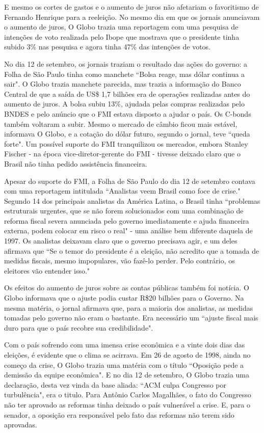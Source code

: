 \documentclass{article}
\begin{document}
E mesmo os cortes de gastos e o aumento de juros não afetariam o favoritismo de Fernando Henrique para a reeleição. No mesmo dia em que os jornais anunciavam o aumento de juros, O Globo trazia uma reportagem com uma pesquisa de intenções de voto realizada pelo Ibope que mostrava que o presidente tinha subido 3\% nas pesquisa e agora tinha 47\% das intenções de votos.              

No dia 12 de setembro, os jornais traziam o resultado das ações do governo: a Folha de São Paulo tinha como manchete ``Bolsa reage, mas dólar continua a sair". O Globo trazia manchete parecida, mas trazia a informação do Banco Central de que a saída de US\$ 1,7 bilhões era de operações realizadas antes do aumento de juros. A bolsa subiu 13\%, ajudada pelas compras realizadas pelo BNDES e pelo anúncio que o FMI estava disposto a ajudar o país. Os C-bonds também voltaram a subir. Mesmo o mercado de câmbio ficou mais estável, informava O Globo, e a cotação do dólar futuro, segundo o jornal, teve ``queda forte". Um possível suporte do FMI tranquilizou os mercados, embora Stanley Fischer - na época vice-diretor-gerente do FMI - tivesse deixado claro que o Brasil não tinha pedido assistência financeira.

Apesar do suporte do FMI, a Folha de São Paulo do dia 12 de setembro contava com uma reportagem intitulada ``Analistas veem Brasil como foce de crise." Segundo 14 dos principais analistas da América Latina, o Brasil tinha ``problemas estruturais urgentes, que se não forem solucionados com uma combinação de reforma fiscal severa anunciada pelo governo imediatamente e ajuda financeira externa, podem colocar em risco o real" - uma análise bem diferente daquela de 1997. Os analistas deixavam claro que o governo precisava agir, e um deles afirmava que ``Se o temor do presidente é a eleição, não acredito que a tomada de medidas fiscais, mesmo impopulares, vão fazê-lo perder. Pelo contrário, os eleitores vão entender isso." 

Os efeitos do aumento de juros sobre as contas públicas também foi notícia. O Globo informava que o ajuste podia custar R\$20 bilhões para o Governo. Na mesma matéria, o jornal afirmava que, para a maioria dos analistas, as medidas tomadas pelo governo não eram o bastante. Era necessário um ``ajuste fiscal mais duro para que o país recobre sua credibilidade". 

Com o país sofrendo com uma imensa crise econômica e a vinte dois dias das eleições, é evidente que o clima se acirrava. Em 26 de agosto de 1998, ainda no começo da crise, O Globo trazia uma matéria com o título ``Oposição pede a demissão da equipe econômica". E no dia 12 de setembro, O Globo trazia uma declaração, desta vez vinda da base aliada: ``ACM culpa Congresso por turbulência", era o titulo. Para Antônio Carlos Magalhães, o fato do Congresso não ter aprovado as reformas tinha deixado o país vulnerável a crise. E, para o senador, a oposição era responsável pelo fato das reformas não terem sido aprovadas.   
\end{document}
